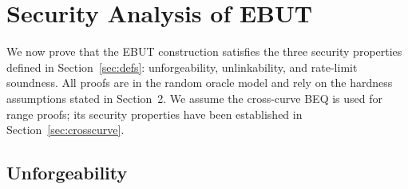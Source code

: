 \documentclass[11pt]{article}
\theoremstyle{definitionstyle}
\theoremstyle{plain}
\begin{document}
\section{Security Analysis of EBUT}
\label{sec:security-ebut}

We now prove that the EBUT construction satisfies the three security properties defined in Section~\ref{sec:defs}: unforgeability, unlinkability, and rate-limit soundness. All proofs are in the random oracle model and rely on the hardness assumptions stated in Section~2. We assume the cross-curve BEQ is used for range proofs; its security properties have been established in Section~\ref{sec:crosscurve}.

\subsection{Unforgeability}
\end{document}

